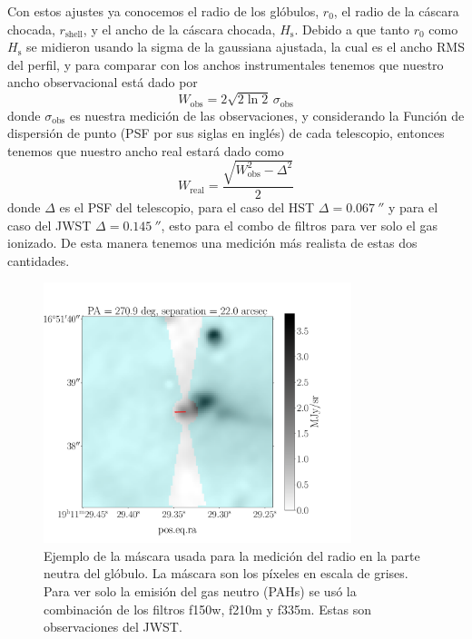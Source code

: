 \documentclass{book}
\begin{document}
Con estos ajustes ya conocemos el radio de los glóbulos, $r_0$, el
radio de la cáscara chocada, $r_\mathrm{shell}$, y el ancho de la
cáscara chocada, $H_\mathrm{s}$. Debido a que tanto $r_0$ como
$H_\mathrm{s}$ se midieron usando la sigma de la gaussiana ajustada,
la cual es el ancho RMS del perfil, y para comparar con los anchos
instrumentales tenemos que nuestro ancho observacional está dado por
\begin{equation}
    W_\mathrm{obs}= 2\sqrt{2\ln{2}} \, \sigma_\mathrm{obs}
\end{equation}
donde $\sigma_\mathrm{obs}$ es nuestra medición de las observaciones, y
considerando la Función de dispersión de punto (PSF por sus siglas en
inglés) de cada telescopio, entonces tenemos que nuestro ancho real
estará dado como
\begin{equation}
    W_\mathrm{real} = \frac{\sqrt{W_\mathrm{obs}^2-\Delta^2}}{2}
\end{equation}
donde $\Delta$ es el PSF del telescopio, para el caso del HST
$\Delta=\SI{0.067}{\arcsecond}$ y para el caso del JWST
$\Delta=\SI{0.145}{\arcsecond}$, esto para el combo de filtros para
ver solo el gas ionizado. De esta manera tenemos una medición más
realista de estas dos cantidades.

\begin{figure}[htb]
    \centering
    \includegraphics[width=0.8\textwidth]{Nuevas imagenes finales/r_0_.pdf}
    \caption{Ejemplo de la máscara usada para la medición del radio en
      la parte neutra del glóbulo. La máscara son los píxeles en
      escala de grises. Para ver solo la emisión del gas neutro (PAHs)
      se usó la combinación de los filtros f150w, f210m y f335m. Estas
      son observaciones del JWST.}
    \label{Medicion de r_0}
\end{figure}
\end{document}
